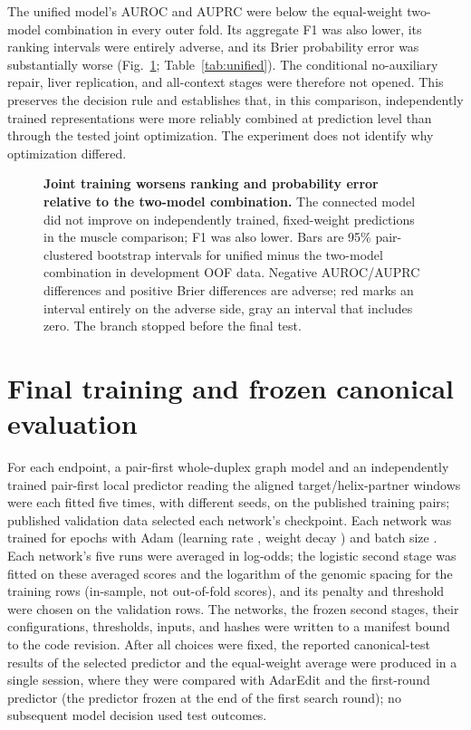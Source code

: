 \documentclass[9pt,twoside]{pnas-new}
\begin{document}
The unified model's AUROC and AUPRC were below the equal-weight two-model combination in every outer fold. Its aggregate F1 was also lower, its ranking intervals were entirely adverse, and its Brier probability error was substantially worse (Fig.~\ref{fig:s4}; Table~\ref{tab:unified}). The conditional no-auxiliary repair, liver replication, and all-context stages were therefore not opened. This preserves the decision rule and establishes that, in this comparison, independently trained representations were more reliably combined at prediction level than through the tested joint optimization. The experiment does not identify why optimization differed.

\begin{figure}[H]
\centering

\caption{\textbf{Joint training worsens ranking and probability error relative to the two-model combination.} The connected model did not improve on independently trained, fixed-weight predictions in the muscle comparison; F1 was also lower. Bars are 95\% pair-clustered bootstrap intervals for unified minus the two-model combination in development OOF data. Negative AUROC/AUPRC differences and positive Brier differences are adverse; red marks an interval entirely on the adverse side, gray an interval that includes zero. The branch stopped before the final test.}
\label{fig:s4}
\end{figure}



\section{Final training and frozen canonical evaluation}\label{si:final-evaluation}

For each endpoint, a pair-first whole-duplex graph model and an independently trained pair-first local predictor reading the aligned target/helix-partner windows were each fitted five times, with different seeds, on the published training pairs; published validation data selected each network's checkpoint. Each network was trained for \FinalNetworkEpochs{} epochs with Adam (learning rate \FinalNetworkLearningRate{}, weight decay \FinalNetworkWeightDecay{}) and batch size \FinalNetworkBatchSize{}. Each network's five runs were averaged in log-odds; the logistic second stage was fitted on these averaged scores and the logarithm of the genomic spacing for the training rows (in-sample, not out-of-fold scores), and its penalty and threshold were chosen on the validation rows. The networks, the frozen second stages, their configurations, thresholds, inputs, and hashes were written to a manifest bound to the code revision. After all choices were fixed, the reported canonical-test results of the selected predictor and the equal-weight average were produced in a single session, where they were compared with AdarEdit and the first-round predictor (the predictor frozen at the end of the first search round); no subsequent model decision used test outcomes.
\end{document}
